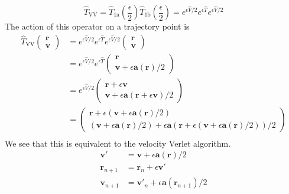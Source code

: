 \documentclass[8pt,a4paper]{article}
\begin{document}
	\begin{equation}
		\hat{T}_\mathrm{VV} = \hat{T}_\mathrm{1a}\left(\frac{\epsilon}{2}\right) \hat{T}_\mathrm{1b}\left(\frac{\epsilon}{2}\right) = e^{\epsilon \hat{V}/2}e^{\epsilon \hat{T}} e^{\epsilon \hat{V}/2}
	\end{equation}
	The action of this operator on a trajectory point is
	\begin{align}
		\hat{T}_\mathrm{VV}
		\begin{pmatrix}
			\mathbf{r} \\ \mathbf{v}
		\end{pmatrix}
		&= e^{\epsilon \hat{V}/2}e^{\epsilon \hat{T}} e^{\epsilon \hat{V}/2}
		\begin{pmatrix}
			\mathbf{r} \\ \mathbf{v}
		\end{pmatrix} \nonumber \\
		&= e^{\epsilon \hat{V}/2}e^{\epsilon \hat{T}}
		\begin{pmatrix}
			\mathbf{r} \\ 
			\mathbf{v} + \epsilon\mathbf{a}(\mathbf{r})/2
		\end{pmatrix} \nonumber \\
		&= e^{\epsilon \hat{V}/2}
		\begin{pmatrix}
			\mathbf{r} + \epsilon \mathbf{v} \\ 
			\mathbf{v} + \epsilon\mathbf{a}(\mathbf{r} + \epsilon \mathbf{v})/2
		\end{pmatrix} \nonumber \\
		&=
		\begin{pmatrix}
			\mathbf{r} + \epsilon (\mathbf{v} + \epsilon\mathbf{a}(\mathbf{r})/2) \\ 
			(\mathbf{v} + \epsilon\mathbf{a}(\mathbf{r})/2) + \epsilon\mathbf{a}(\mathbf{r} + \epsilon (\mathbf{v} + \epsilon\mathbf{a}(\mathbf{r})/2))/2
		\end{pmatrix} \nonumber \\
	\end{align}
	We see that this is equivalent to the velocity Verlet algorithm.
	\begin{align}
		\mathbf{v}' &= \mathbf{v} + \epsilon \mathbf{a}(\mathbf{r})/2 \\
		\mathbf{r}_{n+1} &= \mathbf{r}_n + \epsilon \mathbf{v}' \\
		\mathbf{v}_{n+1} &= \mathbf{v}'_n + \epsilon \mathbf{a}(\mathbf{r}_{n+1})/2
	\end{align}
	
\end{document}
